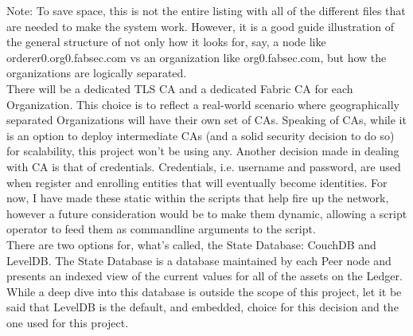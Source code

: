 	
	
	\hspace{10mm}Note: To save space, this is not the entire listing with all of the different files that are needed to make the system work. However, it is a good guide illustration of the general structure of not only how it looks for, say, a node like orderer0.org0.fabsec.com vs an organization like org0.fabsec.com, but how the organizations are logically separated.\\
	
	\hspace{10mm}There will be a dedicated TLS CA and a dedicated Fabric CA for each Organization. This choice is to reflect a real-world scenario where geographically separated Organizations will have their own set of CAs. Speaking of CAs, while it is an option to deploy intermediate CAs (and a solid security decision to do so) for scalability, this project won't be using any. Another decision made in dealing with CA is that of credentials. Credentials, i.e. username and password, are used when register and enrolling entities that will eventually become identities. For now, I have made these static within the scripts that help fire up the network, however a future consideration would be to make them dynamic, allowing a script operator to feed them as commandline arguments to the script.\\
	
	\hspace{10mm}There are two options for, what's called, the State Database: CouchDB and LevelDB. The State Database is a database maintained by each Peer node and presents an indexed view of the current values for all of the assets on the Ledger. While a deep dive into this database is outside the scope of this project, let it be said that LevelDB is the default, and embedded, choice for this decision and the one used for this project.
	

